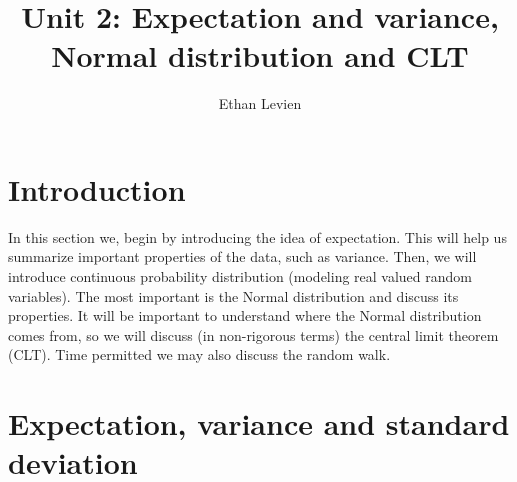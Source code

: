 

\setcounter{unit}{2}
\setcounter{section}{0}




\title{Unit 2: Expectation and variance, Normal distribution and CLT}
\author{Ethan Levien}
\maketitle
\tableofcontents



\section*{Introduction}

In this section we, begin by introducing the idea of expectation. This will help us summarize important properties of the data, such as variance. Then, we will introduce continuous probability distribution (modeling real valued random variables).  The most important is the Normal distribution and discuss its properties. It will be important to understand where the Normal distribution comes from, so we will discuss (in non-rigorous terms) the central limit theorem (CLT).  Time permitted we may also discuss the random walk. 






\section{Expectation, variance and standard deviation}




